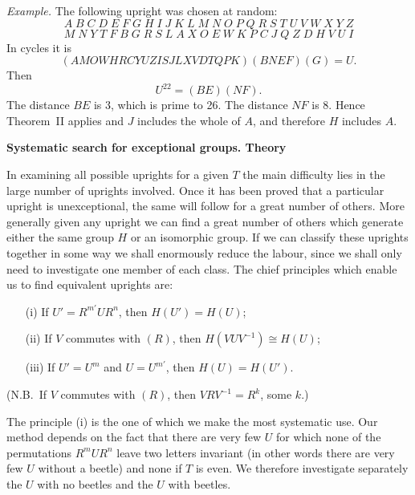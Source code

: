 \documentclass[12pt]{article}
\begin{document}
\medskip

{\em Example.} The following upright was chosen at random:
\[
A \; B \; C \; D \; E \; F \; G \; H \; I \; J \; K \; L \; M \; N \; O \; P \; Q \; R \; S \; T \; U \; V \; W \; X \; Y \; Z
\]
\[
M \; N \; Y \; T \; F \; B \; G \; R \; S \; L \; A \; X \; O \; E \; W \; K \; P \; C \; J \; Q \; Z \; D \; H \; V \; U \; I
\]
In cycles it is
\[
(AMOWHRCYUZI SJLXVDTQPK)(BNEF)(G) = U.
\]
Then 
\[
U^{22} = (BE)(NF).
\]
The distance $BE$ is 3, which is prime to 26. The distance $NF$ is 8. Hence Theorem~II applies and $J$ includes the whole of $A$, and therefore $H$ includes $A$.

\bigskip

\noindent
{\bf Systematic search for exceptional groups. Theory}

\medskip

In examining all possible uprights for a given $T$ the main difficulty lies in the large number of uprights involved. Once it has been proved that a particular upright is unexceptional, the same will follow for a great number of others. More generally given any upright we can find a great number of others which generate either the same group $H$ or an isomorphic group. If we can classify these uprights together in some way we shall enormously reduce the labour, since we shall only need to investigate one member of each class. The chief principles which enable us to find equivalent uprights are:

\begin{itemize}
\item[(i)] If $U' = R^{m'} U R^n$, then $H(U') = H(U)$;
\item[(ii)] If $V$ commutes with $(R)$, then $H(VUV^{-1}) \cong H(U)$;
\item[(iii)] If $U' = U^m$ and $U = U^{m'}$, then $H(U) = H(U')$.
\end{itemize}

(N.B.\ If $V$ commutes with $(R)$, then $VRV^{-1} = R^k$, some $k$.)

\medskip

The principle (i) is the one of which we make the most systematic use. Our method depends on the fact that there are very few $U$ for which none of the permutations $R^m U R^n$ leave two letters invariant (in other words there are very few $U$ without a beetle) and none if $T$ is even. We therefore investigate separately the $U$ with no beetles and the $U$ with beetles.

\bigskip
\end{document}
